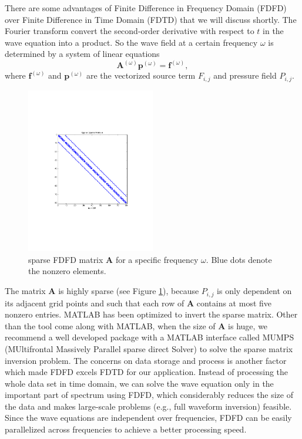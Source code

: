 \documentclass[11pt,titlepage]{article}
\newcommand{\bA}{\boldsymbol{A}}
\newcommand{\bff}{\boldsymbol{f}}
\newcommand{\bp}{\boldsymbol{p}}
\theoremstyle{plain}
\theoremstyle{definition}
\theoremstyle{remark}
\numberwithin{equation}{section}
\begin{document}
There are some advantages of Finite Difference in Frequency Domain (FDFD) over Finite Difference in Time Domain (FDTD) that we will discuss shortly. The Fourier transform convert the second-order derivative with respect to $t$ in the wave equation into a product. So the wave field at a certain frequency $\omega$ is determined by a system of linear equations 
\begin{equation}\label{eq:awFreq}
\bA^{(\omega)}\bp^{(\omega)} = \bff^{(\omega)},
\end{equation}
where $\bff^{(\omega)}$ and $\bp^{(\omega)}$ are the vectorized source term $F_{i,j}$ and pressure field $P_{i,j}$.
 \begin{figure}[htbp]
\centering
\includegraphics[width=0.5\textwidth]{Fig/FDFDMatrixA.pdf}
\caption{sparse FDFD matrix $\bA$ for a specific frequency $\omega$. Blue dots denote the nonzero elements.}
\label{fig:SparseA}
\end{figure}

The matrix $\bA$ is highly sparse (see Figure \ref{fig:SparseA}), because $P_{i,j}$ is only dependent on its adjacent grid points and such that each row of $\bA$ contains at most five nonzero entries.
  MATLAB has been optimized to invert the sparse matrix. Other than the tool come along with MATLAB, when the size of $\bA$ is huge, we recommend a well developed package with a MATLAB interface called MUMPS (MUltifrontal Massively Parallel sparse direct Solver) to solve the sparse matrix inversion problem. 
 The concerns on data storage and process is another factor which made FDFD excels FDTD for our application. Instead of processing the whole data set in time domain, we can solve the wave equation only in the important part of spectrum using FDFD, which considerably reduces the size of the data and makes large-scale problems (e.g., full waveform inversion) feasible. Since the wave equations are independent over frequencies, FDFD can be easily parallelized across frequencies to achieve a better processing speed.
\end{document}
